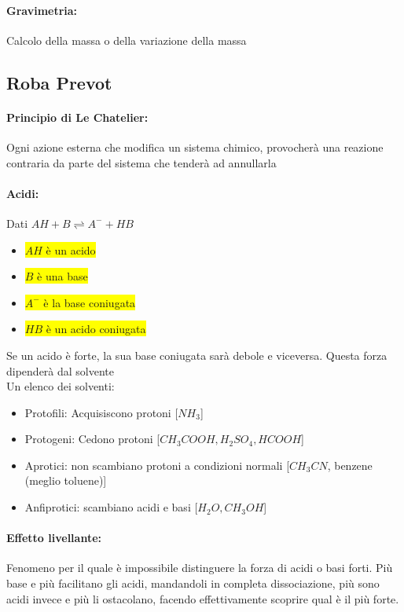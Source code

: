 \documentclass{article}
\begin{document}
\paragraph{Gravimetria:} Calcolo della massa o della variazione della massa

\subsection{Roba Prevot}
\paragraph{Principio di Le Chatelier:} Ogni azione esterna che modifica un sistema chimico, provocherà una reazione contraria da parte del sistema che tenderà ad annullarla

\paragraph{Acidi:} Dati $AH + B \rightleftharpoons A^- + HB$
\begin{itemize}
	\item \colorbox{yellow}{$AH$ è un acido}
	\item \colorbox{yellow}{$B$ è una base}
	\item \colorbox{yellow}{$A^-$ è la base coniugata  }
	\item \colorbox{yellow}{$HB$ è un acido coniugata}
\end{itemize}
Se un acido è forte, la sua base coniugata sarà debole e viceversa. Questa forza dipenderà dal solvente
\\
Un elenco dei solventi:
\begin{itemize}
	\item Protofili: Acquisiscono protoni [$NH_3$]
	\item Protogeni: Cedono protoni [$CH_3COOH, H_2SO_4,HCOOH$]
	\item Aprotici: non scambiano protoni a condizioni normali [$CH_3CN$, benzene (meglio toluene)]
	\item Anfiprotici: scambiano acidi e basi [$H_2O, CH_3OH$]
\end{itemize}

\paragraph{Effetto livellante:} Fenomeno per il quale è impossibile distinguere la forza di acidi o basi forti. Più base e più facilitano gli acidi, mandandoli in completa dissociazione, più sono acidi invece e più li ostacolano, facendo effettivamente scoprire qual è il più forte.
\end{document}
